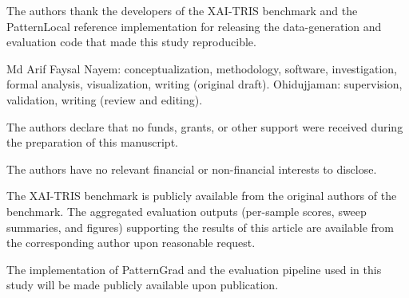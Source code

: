 \documentclass[pdflatex,sn-mathphys-num]{sn-jnl}
\theoremstyle{thmstyleone}
\theoremstyle{thmstyletwo}%
\theoremstyle{thmstylethree}%
\begin{document}
\backmatter


The authors thank the developers of the XAI-TRIS benchmark and the PatternLocal reference implementation for releasing the data-generation and evaluation code that made this study reproducible.


Md Arif Faysal Nayem: conceptualization, methodology, software, investigation, formal analysis, visualization, writing (original draft). Ohidujjaman: supervision, validation, writing (review and editing).


The authors declare that no funds, grants, or other support were received during the preparation of this manuscript.


The authors have no relevant financial or non-financial interests to disclose.


The XAI-TRIS benchmark is publicly available from the original authors of the benchmark. The aggregated evaluation outputs (per-sample scores, sweep summaries, and figures) supporting the results of this article are available from the corresponding author upon reasonable request.


The implementation of PatternGrad and the evaluation pipeline used in this study will be made publicly available upon publication.


\end{document}
